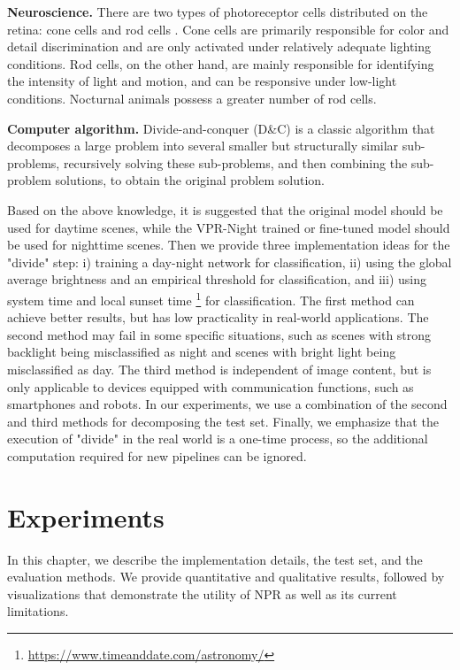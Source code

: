 \documentclass[10pt,twocolumn,letterpaper]{article}
\begin{document}
\noindent \textbf{Neuroscience.} There are two types of photoreceptor cells distributed on the retina: cone cells and rod cells \cite{neural_vision}. Cone cells are primarily responsible for color and detail discrimination and are only activated under relatively adequate lighting conditions. Rod cells, on the other hand, are mainly responsible for identifying the intensity of light and motion, and can be responsive under low-light conditions. Nocturnal animals possess a greater number of rod cells.

\noindent \textbf{Computer algorithm.} Divide-and-conquer \cite{intro_algorithm} (D\&C) is a classic algorithm that decomposes a large problem into several smaller but structurally similar sub-problems, recursively solving these sub-problems, and then combining the sub-problem solutions, to obtain the original problem solution. 

Based on the above knowledge, it is suggested that the original model should be used for daytime scenes, while the VPR-Night trained or fine-tuned model should be used for nighttime scenes. Then we provide three implementation ideas for the "divide" step: i) training a day-night network for classification, ii) using the global average brightness and an empirical threshold for classification, and iii) using system time and local sunset time \footnote{\href{https://www.timeanddate.com/astronomy/}{https://www.timeanddate.com/astronomy/}} for classification. The first method can achieve better results, but has low practicality in real-world applications. The second method may fail in some specific situations, such as scenes with strong backlight being misclassified as night and scenes with bright light being misclassified as day. The third method is independent of image content, but is only applicable to devices equipped with communication functions, such as smartphones and robots. In our experiments, we use a combination of the second and third methods for decomposing the test set. Finally, we emphasize that the execution of "divide" in the real world is a one-time process, so the additional computation required for new pipelines can be ignored.


\section{Experiments}



In this chapter, we describe the implementation details, the test set, and the evaluation methods. We provide quantitative and qualitative results, followed by visualizations that demonstrate the utility of NPR as well as its current limitations.
\end{document}
